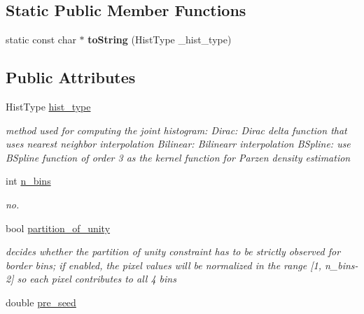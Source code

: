\subsection*{Static Public Member Functions}
\begin{DoxyCompactItemize}
\item 
\hypertarget{structSCVParams_ae903aadb93ae37e6c1ad1be5a658b0f5}{static const char $\ast$ {\bfseries to\-String} (Hist\-Type \-\_\-hist\-\_\-type)}\label{structSCVParams_ae903aadb93ae37e6c1ad1be5a658b0f5}

\end{DoxyCompactItemize}
\subsection*{Public Attributes}
\begin{DoxyCompactItemize}
\item 
\hypertarget{structSCVParams_a0369cd7255077223b4c09704eff4d512}{Hist\-Type \hyperlink{structSCVParams_a0369cd7255077223b4c09704eff4d512}{hist\-\_\-type}}\label{structSCVParams_a0369cd7255077223b4c09704eff4d512}

\begin{DoxyCompactList}\small\item\em method used for computing the joint histogram\-: Dirac\-: Dirac delta function that uses nearest neighbor interpolation Bilinear\-: Bilinearr interpolation B\-Spline\-: use B\-Spline function of order 3 as the kernel function for Parzen density estimation \end{DoxyCompactList}\item 
int \hyperlink{structSCVParams_a08402ab19dd0c54cb7a7a069dd850fb1}{n\-\_\-bins}
\begin{DoxyCompactList}\small\item\em no. \end{DoxyCompactList}\item 
\hypertarget{structSCVParams_a07ea7fdc50880b98abbc7891d1d1b80b}{bool \hyperlink{structSCVParams_a07ea7fdc50880b98abbc7891d1d1b80b}{partition\-\_\-of\-\_\-unity}}\label{structSCVParams_a07ea7fdc50880b98abbc7891d1d1b80b}

\begin{DoxyCompactList}\small\item\em decides whether the partition of unity constraint has to be strictly observed for border bins; if enabled, the pixel values will be normalized in the range \mbox{[}1, n\-\_\-bins-\/2\mbox{]} so each pixel contributes to all 4 bins \end{DoxyCompactList}\item 
\hypertarget{structSCVParams_aa90f516a236da5ab2b5147d1195ab6f6}{double \hyperlink{structSCVParams_aa90f516a236da5ab2b5147d1195ab6f6}{pre\-\_\-seed}}\label{structSCVParams_aa90f516a236da5ab2b5147d1195ab6f6}


\end{DoxyCompactItemize}
